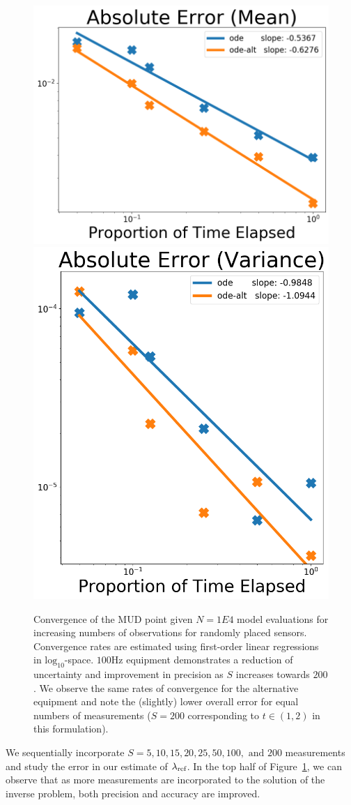 \begin{figure}[htbp]
  \centering
  \includegraphics[width=0.475\linewidth]{figures/ode/ode_convergence_mud_obs_mean}
  \includegraphics[width=0.475\linewidth]{figures/ode/ode_convergence_mud_obs_var}

  \caption{Convergence of the MUD point given $N=1E4$ model evaluations for increasing numbers of observations for randomly placed sensors.
  Convergence rates are estimated using first-order linear regressions in $\text{log}_{10}$-space.
  $100$Hz equipment demonstrates a reduction of uncertainty and improvement in precision as $S$ increases towards $200$.
  We observe the same rates of convergence for the alternative equipment and note the (slightly) lower overall error for equal numbers of measurements ($S=200$ corresponding to $t\in (1,2)$ in this formulation).
  }
  \label{fig:ode-convergence-obs}
\end{figure}
We sequentially incorporate $S=5, 10, 15, 20, 25, 50, 100, \text{ and } 200$ measurements and study the error in our estimate of $\lambda_\text{ref}$.
In the top half of Figure~\ref{fig:ode-convergence-obs}, we can observe that as more measurements are incorporated to the solution of the inverse problem, both precision and accuracy are improved.



